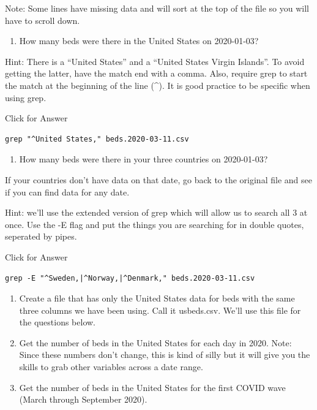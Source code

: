 \documentclass[
]{book}
\providecommand{\tightlist}{%
  \setlength{\itemsep}{0pt}\setlength{\parskip}{0pt}}
\begin{document}
Note: Some lines have missing data and will sort at the top of the file so you will have to scroll down.

\begin{enumerate}
\def\labelenumi{\arabic{enumi}.}
\setcounter{enumi}{16}
\tightlist
\item
  How many beds were there in the United States on 2020-01-03?
\end{enumerate}

Hint: There is a ``United States'' and a ``United States Virgin Islands''. To avoid getting the latter, have the match end with a comma. Also, require grep to start the match at the beginning of the line (\^{}). It is good practice to be specific when using grep.

Click for Answer

\begin{verbatim}
grep "^United States," beds.2020-03-11.csv
\end{verbatim}

\hfill\break

\begin{enumerate}
\def\labelenumi{\arabic{enumi}.}
\setcounter{enumi}{17}
\tightlist
\item
  How many beds were there in your three countries on 2020-01-03?
\end{enumerate}

If your countries don't have data on that date, go back to the original file and see if you can find data for any date.

Hint: we'll use the extended version of grep which will allow us to search all 3 at once. Use the -E flag and put the things you are searching for in double quotes, seperated by pipes.

Click for Answer

\begin{verbatim}
grep -E "^Sweden,|^Norway,|^Denmark," beds.2020-03-11.csv
\end{verbatim}

\hfill\break

\begin{enumerate}
\def\labelenumi{\arabic{enumi}.}
\setcounter{enumi}{18}
\item
  Create a file that has only the United States data for beds with the same three columns we have been using. Call it usbeds.csv. We'll use this file for the questions below.
\item
  Get the number of beds in the United States for each day in 2020. Note: Since these numbers don't change, this is kind of silly but it will give you the skills to grab other variables across a date range.
\item
  Get the number of beds in the United States for the first COVID wave (March through September 2020).
\end{enumerate}
\end{document}
